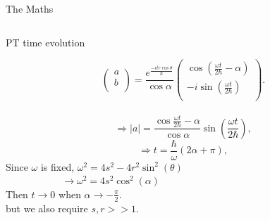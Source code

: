 \documentclass[10pt]{beamer}
\begin{document}
\begin{frame}{The Maths}
\begin{columns}
    \pause
    \begin{column}{0.5\textwidth}
    \vspace{2cm}
    \textcolor{myNewColorC}{PT} time evolution\\
    \vspace{-1cm}
    \begin{scriptsize}
    \begin{equation*}
        \begin{pmatrix}
                a \\
                b \\                
        \end{pmatrix} = \frac{e^{\frac{-itr \cos\theta}{\hbar}}}{\cos{\alpha}}
        \begin{pmatrix}
                \cos(\frac{\omega t}{2 \hbar} - \alpha)\\
                - i \sin(\frac{\omega t}{2\hbar})\\
        \end{pmatrix}.
    \end{equation*}\\
    \pause
    \begin{equation*}
    \Rightarrow |a|= \frac{\cos{\frac{\omega t}{2 \hbar} -\alpha}}{\cos{\alpha}} \sin\left(\frac{\omega t}{2\hbar}\right),
    \end{equation*}
    \pause
    \begin{equation*}
    \Rightarrow t = \frac{\hbar}{\omega}(2 \alpha + \pi) ,
    \end{equation*}
    \pause
    Since $\omega$ is fixed,
    \textcolor{myNewColorD}{$\omega^2 = 4s^2 - 4r^2 \sin^{2}(\theta)$}\\
    $\quad\quad\quad\quad\:\:\:\quad \to \omega^2 = 4s^2\cos^2(\alpha)$\\
    \pause
    \vspace{0.5cm}
    Then $t \to 0$ when $\alpha \to -\frac{\pi}{2}$.\\
    but we also require $s, r >> 1$.\\
    \end{scriptsize}
    \end{column}
\end{columns}
\end{frame}
\end{document}

